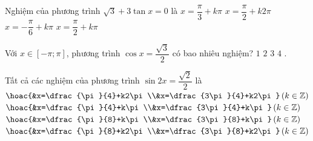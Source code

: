 \begin{ex}%
	Nghiệm của phương trình $\sqrt{3}+3\tan  x=0$ là
	 \choice
		{$x=\dfrac{\pi }{3}+k\pi  $}
		{$x=\dfrac{\pi }{2}+k2\pi  $}
		{\True $x=-\dfrac{\pi }{6}+k\pi $} 
		 {$x=\dfrac{\pi }{2}+k\pi $}
\end{ex}

\begin{ex}%
	Với $x\in[-\pi;\pi]$, phương trình $\cos x=\dfrac{\sqrt{3}}{2}$  có bao nhiêu nghiệm?
	\choice 
		 {$1$}
		{\True  $2$}
		 {$3$}
		 {$4$}
	 .
\end{ex}

\begin{ex}%
	Tất cả các nghiệm của  phương trình $\sin 2x=\dfrac{\sqrt{2}}{2}$ là
	 \choice
		{$\hoac{&x=\dfrac{\pi}{4}+k2\pi\\&x=\dfrac{3\pi}{4}+k2\pi} \left(k\in \mathbb{Z}\right)$} 
		{$\hoac{&x=\dfrac{\pi}{4}+k\pi\\&x=\dfrac{3\pi}{4}+k\pi}  \left(k\in \mathbb{Z}\right)$}
		{\True $\hoac{&x=\dfrac{\pi}{8}+k\pi\\&x=\dfrac{3\pi}{8}+k\pi} \left(k\in  \mathbb{Z}\right)$}
		{$\hoac{&x=\dfrac{\pi}{8}+k2\pi\\&x=\dfrac{3\pi}{8}+k2\pi} \left(k\in  \mathbb{Z}\right)$}
\end{ex}


